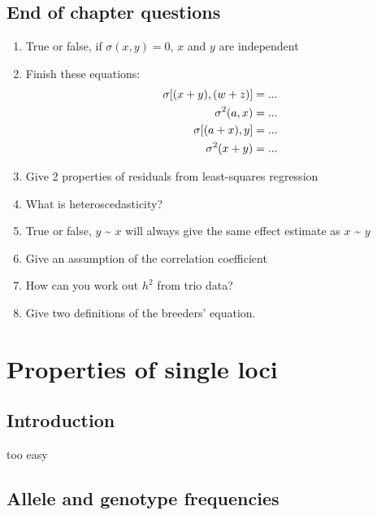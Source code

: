 \documentclass[
]{book}
\providecommand{\tightlist}{%
  \setlength{\itemsep}{0pt}\setlength{\parskip}{0pt}}
\begin{document}
\hypertarget{end-of-chapter-questions}{%
\section{End of chapter questions}\label{end-of-chapter-questions}}

\begin{enumerate}
\def\labelenumi{\arabic{enumi}.}
\tightlist
\item
  True or false, if \(\sigma(x,y) = 0\), \(x\) and \(y\) are independent
\item
  Finish these equations:
  \begin{align}
    \sigma[(x + y),(w + z)] &= ... \notag \\
    \sigma^2(a, x) &= ... \notag \\
    \sigma[(a + x), y] &= ... \notag \\
    \sigma^2(x + y) &= ... \notag \\
  \end{align}
\item
  Give 2 properties of residuals from least-squares regression
\item
  What is heteroscedasticity?
\item
  True or false, \(y\) \textasciitilde{} \(x\) will always give the same effect estimate as \(x\) \textasciitilde{} \(y\)
\item
  Give an assumption of the correlation coefficient
\item
  How can you work out \(h^2\) from trio data?
\item
  Give two definitions of the breeders' equation.
\end{enumerate}

\hypertarget{properties-of-single-loci}{%
\chapter{Properties of single loci}\label{properties-of-single-loci}}

\hypertarget{introduction}{%
\section{Introduction}\label{introduction}}

too easy

\hypertarget{allele-and-genotype-frequencies}{%
\section{Allele and genotype frequencies}\label{allele-and-genotype-frequencies}}
\end{document}
